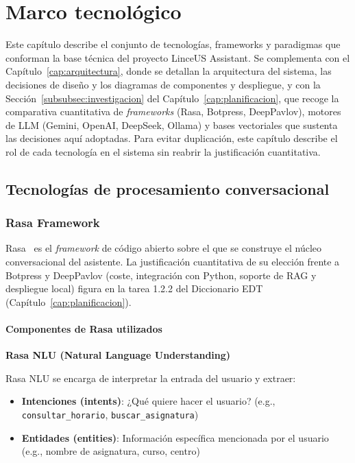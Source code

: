 
\chapter{Marco tecnológico}\label{cap:marco-tecnologico}

Este capítulo describe el conjunto de tecnologías, frameworks y paradigmas que conforman la base técnica del proyecto LinceUS Assistant. Se complementa con el Capítulo~\ref{cap:arquitectura}, donde se detallan la arquitectura del sistema, las decisiones de diseño y los diagramas de componentes y despliegue, y con la Sección~\ref{subsubsec:investigacion} del Capítulo~\ref{cap:planificacion}, que recoge la comparativa cuantitativa de \textit{frameworks} (Rasa, Botpress, DeepPavlov), motores de LLM (Gemini, OpenAI, DeepSeek, Ollama) y bases vectoriales que sustenta las decisiones aquí adoptadas. Para evitar duplicación, este capítulo describe el rol de cada tecnología en el sistema sin reabrir la justificación cuantitativa.

\section{Tecnologías de procesamiento conversacional}\label{sec:procesamiento-conversacional}

\subsection{Rasa Framework}

Rasa~\cite{rasadocs,bocklisch2017rasa} es el \textit{framework} de código abierto sobre el que se construye el núcleo conversacional del asistente. La justificación cuantitativa de su elección frente a Botpress y DeepPavlov (coste, integración con Python, soporte de RAG y despliegue local) figura en la tarea 1.2.2 del Diccionario EDT (Capítulo~\ref{cap:planificacion}).

\subsubsection{Componentes de Rasa utilizados}

\textbf{Rasa NLU (Natural Language Understanding)}

Rasa NLU se encarga de interpretar la entrada del usuario y extraer:
\begin{itemize}
    \item \textbf{Intenciones (intents)}: ¿Qué quiere hacer el usuario? (e.g., \texttt{consultar\_horario}, \texttt{buscar\_asignatura})
    \item \textbf{Entidades (entities)}: Información específica mencionada por el usuario (e.g., nombre de asignatura, curso, centro)
\end{itemize}

